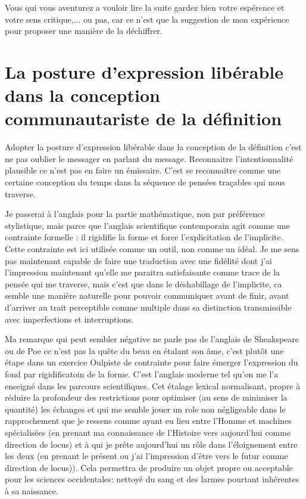 \documentclass{article}
\begin{document}
  Vous qui vous aventurez a vouloir lire la suite gardez bien votre espérence et votre sens critique,... ou pas, car ce n'est que la suggestion de mon expérience pour proposer une manière de la déchiffrer.
  
\section{La posture d'expression libérable dans la conception  communautariste de la définition}
Adopter la posture d'expression  libérable dans la conception de la définition c'est ne pas oublier le messager en parlant du message.
Reconnaitre l'intentionnalité plausible ce n'est pas en faire un émissaire. C'est se reconnaitre comme une certaine conception du temps dans la séquence de pensées traçables qui nous traverse.

Je passerai à l’anglais pour la partie mathématique, non par préférence stylistique, mais parce que l’anglais scientifique contemporain agit comme une contrainte formelle : il rigidifie la forme et force l’explicitation de l’implicite. Cette contrainte est ici utilisée comme un outil, non comme un idéal. %
 Je me sens pas   maintenant   capable de faire une traduction avec  une fidélité dont j'ai l'impression maintenant qu'elle  me paraitra satisfaisante comme trace de la pensée qui me traverse, mais  c'est que dans le déshabillage de l'implicite, ca semble une manière naturelle pour pouvoir communiquer avant de finir, avant d'arriver au trait perceptible comme multiple dans sa distinction  transmissible avec imperfections et interruptions.
 
  Ma remarque qui peut sembler négative ne parle pas de  l'anglais de Sheakspeare ou de Poe ce n'est pas la quête du beau en étalant son âme, c'est plutôt une étape dans un exercice Oulpiste de contrainte pour faire émerger l'expression du fond par rigidificatoin de la forme. C'est l'anglais moderne tel qu'on me l'a enseigné dans les parcours scientifiques.  Cet étalage lexical normalisant, propre à réduire la profondeur des restrictions pour optimiser (au sens de minimiser la quantité) les échanges et qui me semble jouer un role non négligeable dans le rapprochement  que je ressens comme ayant eu lieu entre  l'Homme et machines spécialisées (en prenant ma connaissance de l'Histoire vers aujourd'hui comme direction de locus) et à qui je prête aujourd'hui un rôle dans l'éloignement entre les deux (en prenant le présent ou j'ai l'impression d'être  vers le futur  comme  direction de locus)). Cela permettra de produire un objet propre ou acceptable pour les sciences occidentales: nettoyé du sang et des larmes pourtant inhérentes à sa naissance.
\end{document}
